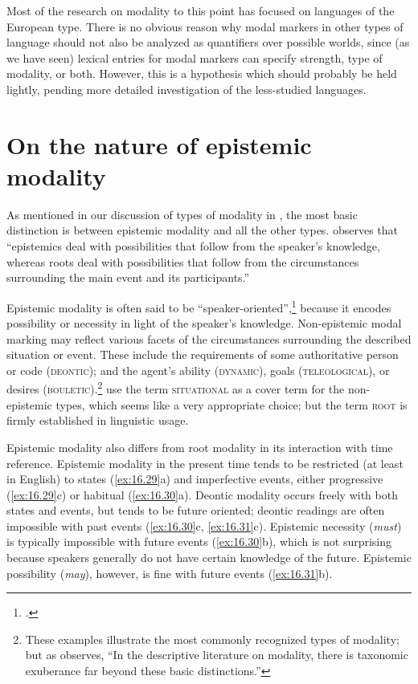 Most of the research on modality to this point has focused on languages of the European type. There is no obvious reason why modal markers in other types of language should not also be analyzed as quantifiers over possible worlds, since (as we have seen) lexical entries for modal markers can specify strength, type of modality, or both. However, this is a hypothesis which should probably be held lightly, pending more detailed investigation of the less-studied languages.


\section{On the nature of epistemic modality}\label{sec:16.5}

As mentioned in our discussion of types of modality in , the most basic distinction is between epistemic modality and all the other types. \citet[1486]{Hacquard2011} observes that “epistemics deal with possibilities that follow from the speaker’s knowledge, whereas roots deal with possibilities that follow from the circumstances surrounding the main event and its participants.”



Epistemic modality is often said to be “speaker-oriented”,\footnote{\citet{BybeeEtAl1994}.} because it encodes possibility or necessity in light of the speaker’s knowledge. Non-epistemic modal marking may reflect various facets of the circumstances surrounding the described situation or event. These include the requirements of some authoritative person or code (\textsc{deontic}); and the agent’s ability (\textsc{dynamic}), goals (\textsc{teleological}), or desires (\textsc{bouletic}).\footnote{These examples illustrate the most commonly recognized types of modality; but as \citet{vonFintel2006} observes, “In the descriptive literature on modality, there is taxonomic exuberance far beyond these basic distinctions.”}   use the term \textsc{situational} as a cover term for the non-epistemic types, which seems like a very appropriate choice; but the term \textsc{root} is firmly established in linguistic usage.



Epistemic modality also differs from root modality in its interaction with time reference. Epistemic modality in the present time tends to be restricted (at least in English) to states (\ref{ex:16.29}a) and imperfective events, either progressive (\ref{ex:16.29}c) or habitual (\ref{ex:16.30}a). Deontic modality occurs freely with both states and events, but tends to be future oriented; deontic readings are often impossible with past events (\ref{ex:16.30}c, \ref{ex:16.31}c). Epistemic necessity (\textit{must}) is typically impossible with future events (\ref{ex:16.30}b), which is not surprising because speakers generally do not have certain knowledge of the future. Epistemic possibility (\textit{may}), however, is fine with future events (\ref{ex:16.31}b). 


